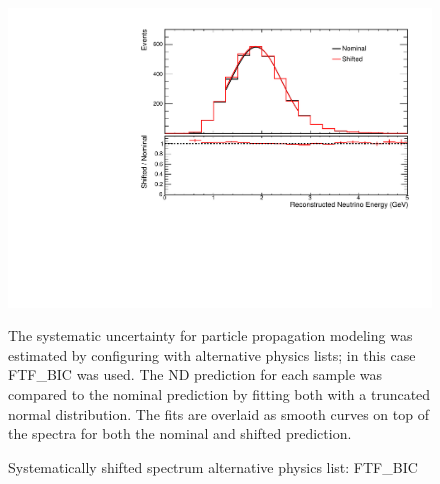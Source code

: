 {\begin{figure}
\begin{center}
\includegraphics[width=\textwidth]{figures/systs/params/nd_FTF_BIC.pdf}
\end{center}
\caption{Systematically shifted spectrum alternative \geant
physics list: FTF\_BIC}{
The systematic uncertainty for particle propagation modeling was estimated
by configuring \geant with alternative physics lists; in this case FTF\_BIC
was used.
The ND prediction for each sample was compared to the nominal prediction
by fitting both with a truncated normal distribution.
The fits are overlaid as smooth curves on top of the spectra for both
the nominal and shifted prediction.
}
\label{syst_param_nd_FTF_BIC}

\end{figure}


}
